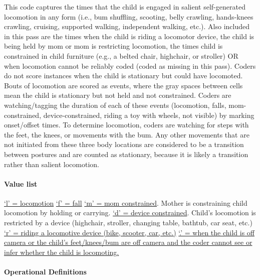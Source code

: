 \documentclass[
  12pt,
]{book}
\begin{document}
This code captures the times that the child is engaged in salient self-generated locomotion in any form (i.e., bum shuffling, scooting, belly crawling, hands-knees crawling, cruising, supported walking, independent walking, etc.). Also included in this pass are the times when the child is riding a locomotor device, the child is being held by mom or mom is restricting locomotion, the times child is constrained in child furniture (e.g., a belted chair, highchair, or stroller) OR when locomotion cannot be reliably coded (coded as missing in this pass). Coders do not score instances when the child is stationary but could have locomoted. Bouts of locomotion are scored as events, where the gray spaces between cells mean the child is stationary but not held and not constrained.
Coders are watching/tagging the duration of each of these events (locomotion, falls, mom-constrained, device-constrained, riding a toy with wheels, not visible) by marking onset/offset times. To determine locomotion, coders are watching for steps with the feet, the knees, or movements with the bum. Any other movements that are not initiated from these three body locations are considered to be a transition between postures and are counted as stationary, because it is likely a transition rather than salient locomotion.

\hypertarget{child_locomotion_values}{%
\paragraph*{Value list}\label{child_locomotion_values}}

\protect\hyperlink{child_locomotion}{`l' = locomotion}
\protect\hyperlink{child_fall}{`f' = fall}
\protect\hyperlink{mom_constrained}{`m' = mom constrained}. Mother is constraining child locomotion by holding or carrying.
\protect\hyperlink{device_constrained}{`d' = device constrained}. Child's locomotion is restricted by a device (highchair, stroller, changing table, bathtub, car seat, etc.)
\protect\hyperlink{ride}{`r' = riding a locomotive device (bike, scooter, car, etc.)}
\protect\hyperlink{child_missing}{`.' = when the child is off camera or the child's feet/knees/bum are off camera and the coder cannot see or infer whether the child is locomoting.}

\hypertarget{operational-definitions-1}{%
\paragraph*{Operational Definitions}\label{operational-definitions-1}}
\end{document}
